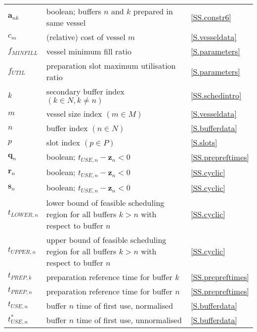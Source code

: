 {\begin{longtabu} to 
     &  & \\\hline
    \endhead
    $\boldsymbol{a}_{nk}$ & boolean; buffers $n$ and $k$ prepared in same
    vessel & \ref{SS.constr6}\\
    $c_{m}$ & (relative) cost of vessel $m$ & \ref{S.vesseldata}\\
    $f_{\mathit{MINFILL}}$ & vessel minimum fill ratio & \ref{S.parameters}\\
    $f_{\mathit{UTIL}}$ & preparation slot maximum utilisation ratio
        & \ref{S.parameters}\\
    $k$ & secondary buffer index $\left( k \in N, k \ne n \right)$
        & \ref{SS.schedintro}\\
    $m$ & vessel size index $\left( m \in M \right)$ & \ref{S.vesseldata}\\
    $n$ & buffer index $\left( n \in N \right)$ & \ref{S.bufferdata}\\
    $p$ & slot index $\left( p \in P \right)$ & \ref{S.slots}\\
    $\boldsymbol{q}_{n}$ & boolean; 
        $t_{\mathit{USE},n} - \boldsymbol{z}_{n} < 0$ & \ref{SS.prepreftimes}\\
    $\boldsymbol{r}_{n}$ & boolean; 
        $t_{\mathit{USE},n} - \boldsymbol{z}_{n} < 0$ & \ref{SS.cyclic}\\
    $\boldsymbol{s}_{n}$ & boolean; 
        $t_{\mathit{USE},n} - \boldsymbol{z}_{n} < 0$ & \ref{SS.cyclic}\\
    $t_{\mathit{LOWER},n}$ & lower bound of feasible scheduling region for all
        buffers $k > n$ with respect to buffer $n$ & \ref{SS.cyclic}\\
    $t_{\mathit{UPPER},n}$ & upper bound of feasible scheduling region for all
        buffers $k > n$ with respect to buffer $n$ & \ref{SS.cyclic}\\
    $t_{\mathit{PREP},k}$ & preparation reference time for buffer $k$ 
        & \ref{SS.prepreftimes}\\
    $t_{\mathit{PREP},n}$ & preparation reference time for buffer $n$ 
        & \ref{SS.prepreftimes}\\
    $t_{\mathit{USE},n}$ & buffer $n$ time of first use, normalised
        & \ref{S.bufferdata}\\
    $t_{\mathit{USE},n}^{*}$ & buffer $n$ time of first use, unnormalised 
        & \ref{S.bufferdata}\\

\end{longtabu}}
